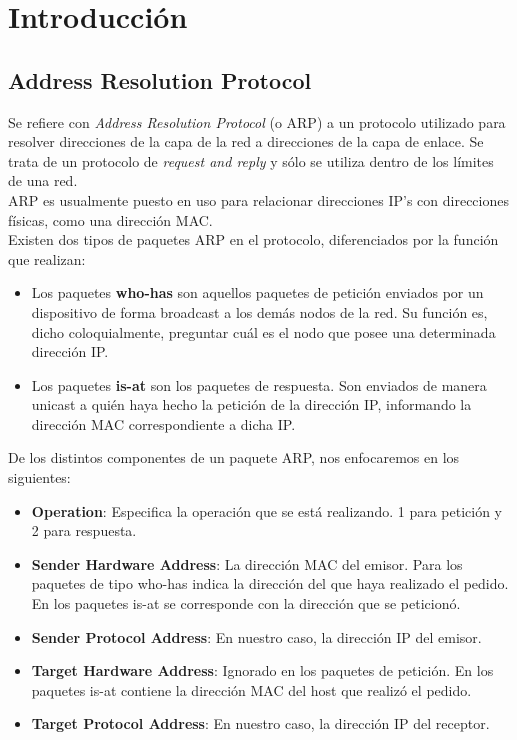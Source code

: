 \section{Introducción}

\subsection{Address Resolution Protocol}

\indent \indent  Se refiere con \textit{Address Resolution Protocol} (o ARP) a un protocolo utilizado para resolver direcciones de la capa de la red a direcciones de la capa de enlace. Se trata de un protocolo de \textit{request and reply} y sólo se utiliza dentro de los límites de una red.\\
\indent ARP es usualmente puesto en uso para relacionar direcciones IP's con direcciones físicas, como una dirección MAC.\\
\indent Existen dos tipos de paquetes ARP en el protocolo, diferenciados por la función que realizan: 
\begin{itemize}
\item Los paquetes \textbf{who-has} son aquellos paquetes de petición enviados por un dispositivo de forma broadcast a los demás nodos de la red. Su función es, dicho coloquialmente, preguntar cuál es el nodo que posee una determinada dirección IP.
\item Los paquetes \textbf{is-at} son los paquetes de respuesta. Son enviados de manera unicast a quién haya hecho la petición de la dirección IP, informando la dirección MAC correspondiente a dicha IP. 
\end{itemize}

\indent De los distintos componentes de un paquete ARP, nos enfocaremos en los siguientes:
\begin{itemize}
\item \textbf{Operation}: Especifica la operación que se está realizando. 1 para petición y 2 para respuesta.
\item \textbf{Sender Hardware Address}: La dirección MAC del emisor. Para los paquetes de tipo who-has indica la dirección del que haya realizado el pedido. En los paquetes is-at se corresponde con la dirección que se peticionó.
\item \textbf{Sender Protocol Address}: En nuestro caso, la dirección IP del emisor.
\item \textbf{Target Hardware Address}: Ignorado en los paquetes de petición. En los paquetes is-at contiene la dirección MAC del host que realizó el pedido.
\item \textbf{Target Protocol Address}: En nuestro caso, la dirección IP del receptor.
\end{itemize}

